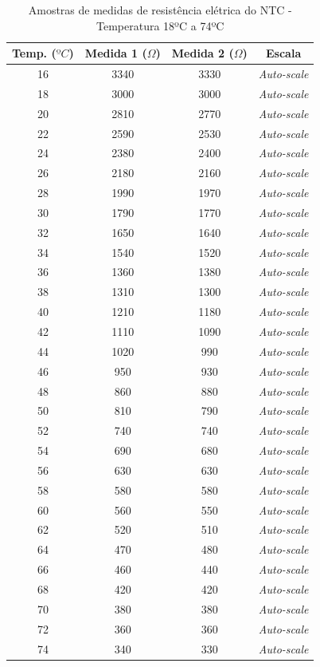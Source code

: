 \documentclass[a4paper]{instrumentacao}
\begin{document}
\begin{table}[H]
\centering
\caption{Amostras de medidas de resistência elétrica do NTC - Temperatura 18ºC a 74ºC}
\label{tab:amostras-ntc}
\begin{tabular}{|c|c|c|c|}
\hline
\textbf{Temp. ($ºC$)} & \textbf{Medida 1 ($\Omega$)} & \textbf{Medida 2 ($\Omega$)} & \textbf{Escala} \\ \hline
 16 & 3340 & 3330 & \textit{Auto-scale} \\ \hline
 18 & 3000 & 3000 & \textit{Auto-scale} \\ \hline
 20 & 2810 & 2770 & \textit{Auto-scale} \\ \hline
 22 & 2590 & 2530 & \textit{Auto-scale} \\ \hline
 24 & 2380 & 2400 & \textit{Auto-scale} \\ \hline
 26 & 2180 & 2160 & \textit{Auto-scale} \\ \hline
 28 & 1990 & 1970 & \textit{Auto-scale} \\ \hline
 30 & 1790 & 1770 & \textit{Auto-scale} \\ \hline
 32 & 1650 & 1640 & \textit{Auto-scale} \\ \hline
 34 & 1540 & 1520 & \textit{Auto-scale} \\ \hline
 36 & 1360 & 1380 & \textit{Auto-scale} \\ \hline
 38 & 1310 & 1300 & \textit{Auto-scale} \\ \hline
 40 & 1210 & 1180 & \textit{Auto-scale} \\ \hline
 42 & 1110 & 1090 & \textit{Auto-scale} \\ \hline
 44 & 1020 & 990 & \textit{Auto-scale} \\ \hline
 46 & 950 & 930 & \textit{Auto-scale} \\ \hline
 48 & 860 & 880 & \textit{Auto-scale} \\ \hline
 50 & 810 & 790 & \textit{Auto-scale} \\ \hline
 52 & 740 & 740 & \textit{Auto-scale} \\ \hline
 54 & 690 & 680 & \textit{Auto-scale} \\ \hline
 56 & 630 & 630 & \textit{Auto-scale} \\ \hline
 58 & 580 & 580 & \textit{Auto-scale} \\ \hline
 60 & 560 & 550 & \textit{Auto-scale} \\ \hline
 62 & 520 & 510 & \textit{Auto-scale} \\ \hline
 64 & 470 & 480 & \textit{Auto-scale} \\ \hline
 66 & 460 & 440 & \textit{Auto-scale} \\ \hline
 68 & 420 & 420 & \textit{Auto-scale} \\ \hline
 70 & 380 & 380 & \textit{Auto-scale} \\ \hline
 72 & 360 & 360 & \textit{Auto-scale} \\ \hline
 74 & 340 & 330 & \textit{Auto-scale} \\ \hline
\end{tabular}
\end{table}
\end{document}

